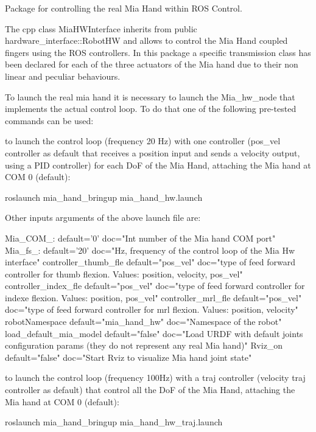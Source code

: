 Package for controlling the real Mia Hand within R\+OS Control.

The cpp class Mia\+H\+W\+Interface inherits from public hardware\+\_\+interface\+::\+Robot\+HW and allows to control the Mia Hand coupled fingers using the R\+OS controllers. In this package a specific transmission class has been declared for each of the three actuators of the Mia hand due to their non linear and peculiar behaviours.

To launch the real mia hand it is necessary to launch the Mia\+\_\+hw\+\_\+node that implements the actual control loop. To do that one of the following pre-\/tested commands can be used\+:


\begin{DoxyItemize}
\item to launch the control loop (frequency 20 Hz) with one controller (pos\+\_\+vel controller as default that receives a position input and sends a velocity output, using a P\+ID controller) for each DoF of the Mia Hand, attaching the Mia hand at C\+OM 0 (default)\+: \begin{DoxyVerb}roslaunch mia_hand_bringup mia_hand_hw.launch
\end{DoxyVerb}


Other inputs arguments of the above launch file are\+: \begin{DoxyVerb}Mia_COM_:               default='0'            doc="Int number of the Mia hand COM port"
Mia_fs_:                default='20'          doc="Hz, frequency of the control loop of the Mia Hw interface"
controller_thumb_fle    default="pos_vel"     doc="type of feed forward controller for thumb flexion. Values: position, velocity, pos_vel"
controller_index_fle    default="pos_vel"     doc="type of feed forward controller for indexe flexion. Values: position, pos_vel"
controller_mrl_fle      default="pos_vel"     doc="type of feed forward controller for mrl flexion. Values: position, velocity"
robotNamespace          default="mia_hand_hw" doc="Namespace of the robot"
load_default_mia_model  default="false"       doc="Load URDF with default joints configuration params (they do not represent any real Mia hand)"
Rviz_on                 default="false"       doc="Start Rviz to visualize Mia hand joint state"
\end{DoxyVerb}

\item to launch the control loop (frequency 100Hz) with a traj controller (velocity traj controller as default) that control all the DoF of the Mia Hand, attaching the Mia hand at C\+OM 0 (default)\+: \begin{DoxyVerb}roslaunch mia_hand_bringup mia_hand_hw_traj.launch
\end{DoxyVerb}



\end{DoxyItemize}
